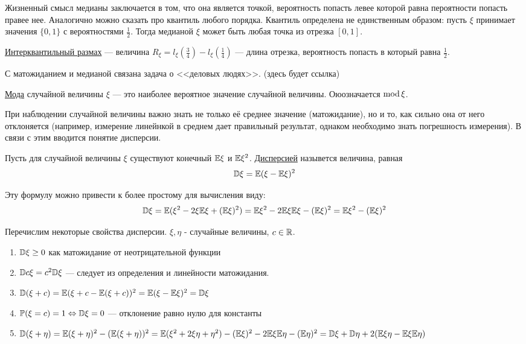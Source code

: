 \documentclass[../TV&MS.tex]{subfiles}
\begin{document}
Жизненный смысл медианы заключается в том, что она является точкой, вероятность попасть левее которой равна пероятности попасть правее нее. Аналогично можно 
сказать про квантиль любого порядка. Квантиль определена не единственным образом: пусть $\xi$ принимает значения $\{0, 1\}$ с вероятностями $\frac12$. Тогда медианой
$\xi$ может быть любая точка из отрезка $[0,1]$.

\begin{Def}
\underline{Интерквантильный размах} --- величина $R_\xi = l_\xi(\frac34) - l_\xi(\frac14)$ --- длина отрезка, вероятность попасть в который равна $\frac12$. 
\end{Def}

С матожиданием и медианой связана задача о <<деловых людях>>. (здесь будет ссылка) 

\begin{Def}
\underline{Мода} случайной величины $\xi$ --- это наиболее вероятное значение случайной величины. Оюозначается ${\rm mod \,}\xi$.
\end{Def}

При наблюдении случайной величины важно знать не только её среднее значение (матожидание), но и то, как сильно она от него отклоняется (например, измерение линейнкой в среднем дает правильный результат, однаком необходимо знать погрешность измерения). В связи с этим вводится понятие дисперсии.

\begin{Def}
Пусть для случайной величины $\xi$ существуют конечный $\mathbb{E}\xi$ и $\mathbb{E}\xi^2$.  \underline{Дисперсией} назывется величина, равная 
$$ \mathbb{D}\xi = \mathbb{E}(\xi - \mathbb{E}\xi)^2$$
\end{Def}

Эту формулу можно привести к более простому для вычисления виду:
$$\mathbb{D}\xi = \mathbb{E}(\xi^2 - 2\xi\mathbb{E}\xi + (\mathbb{E}\xi)^2) = \mathbb{E}\xi^2 - 2\mathbb{E}\xi\mathbb{E}\xi - (\mathbb{E}\xi)^2 = \mathbb{E}\xi^2 - (\mathbb{E}\xi)^2$$


Перечислим некоторые свойства дисперсии. $\xi,\eta$ - случайные величины, $c \in \mathbb{R}$.

\begin{enumerate}
	\item $\mathbb{D}\xi \ge 0$ как матожидание от неотрицательной функции
	\item $\mathbb{D} c\xi = c^2 \mathbb{D}\xi$ --- следует из определения и линейности матожидания.
	\item $\mathbb{D}(\xi+c) = \mathbb{E}(\xi + c - \mathbb{E}(\xi + c))^2 = \mathbb{E}(\xi - \mathbb{E}\xi)^2 = \mathbb{D}\xi$
	\item $\mathbb{P}(\xi = c) = 1 \Leftrightarrow \mathbb{D}\xi = 0$ --- отклонение равно нулю для константы
	\item $\mathbb{D}(\xi + \eta) = \mathbb{E}(\xi+\eta)^2 - (\mathbb{E}(\xi+\eta))^2 = \mathbb{E}(\xi^2+2\xi\eta + \eta^2) - (\mathbb{E}\xi)^2- 2\mathbb{E}\xi\mathbb{E}\eta - (\mathbb{E}\eta)^2 = \mathbb{D}\xi + \mathbb{D}\eta + 2(\mathbb{E}\xi\eta - \mathbb{E}\xi\mathbb{E}\eta)$
\end{enumerate}
\end{document}
